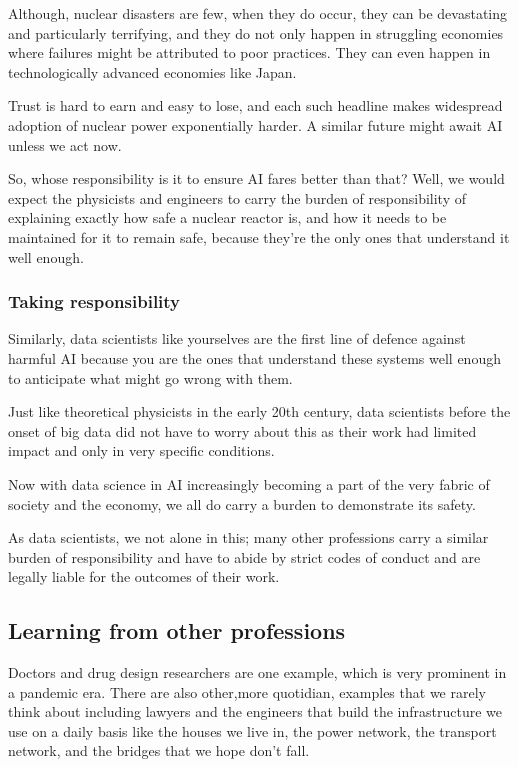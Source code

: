 \documentclass[
]{book}
\theoremstyle{definition}
\theoremstyle{definition}
\theoremstyle{definition}
\theoremstyle{definition}
\theoremstyle{remark}
\begin{document}
Although, nuclear disasters are few, when they do occur, they can be
devastating and particularly terrifying, and they do not only happen
in struggling economies where failures might be attributed to poor practices.
They can even happen in technologically advanced economies like Japan.

Trust is hard to earn and easy to lose, and each such headline makes
widespread adoption of nuclear power exponentially harder. A similar future might await AI unless we act now.

So, whose responsibility is it to ensure AI fares better than that? Well, we would expect the physicists and engineers to carry the burden of responsibility of explaining exactly how safe a nuclear reactor is, and how it needs to be maintained for it to remain safe, because they're the only
ones that understand it well enough.

\hypertarget{taking-responsibility}{%
\subsubsection{Taking responsibility}\label{taking-responsibility}}

Similarly, data scientists like yourselves are the first line of defence against harmful AI because you are the ones that understand these systems well enough to anticipate what might go wrong with them.

Just like theoretical physicists in the early 20th century, data scientists before the onset of big data did not have to worry about this as their work had limited impact and only in very specific conditions.

Now with data science in AI increasingly becoming a part of the very fabric of society and the economy, we all do carry a burden to demonstrate its safety.

As data scientists, we not alone in this; many other professions carry a similar burden of responsibility and have to abide by strict codes of conduct and are legally liable for the outcomes of their work.

\hypertarget{learning-from-other-professions}{%
\subsection{Learning from other professions}\label{learning-from-other-professions}}

Doctors and drug design researchers are one example, which is very prominent in a pandemic era. There are also other,more quotidian, examples that we rarely think about including lawyers and the engineers that build the infrastructure we use on a daily basis like the houses we live in, the power network, the transport network, and the bridges that we hope don't fall.
\end{document}
